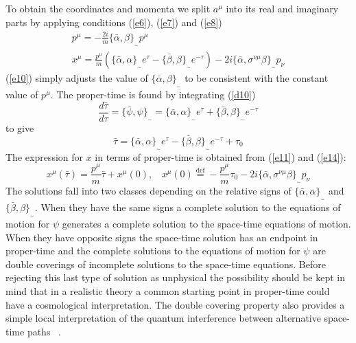 \documentclass[a4paper,a4paper]{article}
\begin{document}
To obtain the coordinates and momenta we split $a^{\mu }$ into its real and
imaginary parts by applying conditions (\ref{e6}), (\ref{e7}) and (\ref{e8}) 
\begin{eqnarray}
p^{\mu } = -\frac{2i}{m}\{\bar{\alpha },\beta \}_{_{\sim }}p^{\mu }
\label{e10}
\\
x^{\mu }= \frac{p^{\mu }}{m}\left(\{\bar{\alpha },\alpha \}_{_{\sim }}e^{\tau }-
\{\bar{\beta},\beta \}_{_{\sim }}e^{-\tau }\right) - 2i\{\bar{\alpha },\sigma
^{\nu \mu}\beta \}_{_{\sim }}p_{\nu }
\label{e11}
\end{eqnarray}
(\ref{e10}) simply adjusts the value of $\{\bar{\alpha },\beta \}_{_{\sim }}$ to
be consistent with the constant value of $p^{\mu }$. The proper-time is found
by integrating (\ref{d10})
\begin{equation}
\frac{d\bar{\tau }}{d\tau } = \{\bar{\psi },\psi  \}_{_{\sim }}= \{\bar{\alpha
},\alpha \}_{_{\sim }}e^{\tau }+\{\bar{\beta  },\beta  \}_{_{\sim }}e^{-\tau }
\label{e13}
\end{equation}
to give
\begin{equation}
\bar{\tau }=\{\bar{\alpha },\alpha \}_{_{\sim }}e^{\tau }-\{\bar{\beta  },\beta 
\}_{_{\sim }}e^{-\tau} + \tau _{0}
\label{e14}
\end{equation}
The expression for $x$ in terms of proper-time is obtained from (\ref{e11}) and
(\ref{e14}):
\begin{equation}
x^{\mu }(\bar{\tau })= \frac{p^{\mu }}{m}\bar{\tau }+x^{\mu }(0),\ \ \ \ x^{\mu
}(0)\stackrel{ \mathrm{def}}{=} -\frac{p^{\mu }}{m}\tau _{0}-2i\{\bar{\alpha
},\sigma ^{\nu \mu }\beta\}_{_{\sim }}p_{\nu }
\label{e15} 
\end{equation}
The solutions fall into two classes depending on the relative signs of
$\{\bar{\alpha },\alpha \}_{_{\sim }}$ and $\{\bar{\beta  },\beta  \}_{_{\sim
}}$. When they have the same signs a complete solution to the equations of
motion for $\psi$ generates a complete solution to the space-time equations of
motion. When they have opposite signs the space-time solution has an endpoint in
proper-time and the complete solutions to the equations of motion for $\psi$
are
double coverings of incomplete solutions to the space-time equations. Before
rejecting this last type of solution as unphysical the possibility should be
kept in mind that in a realistic theory a common starting point in proper-time
could have a cosmological interpretation. The double covering property also
provides a simple local interpretation of the quantum interference between
alternative space-time paths ~\cite{borch4}. 
\end{document}
